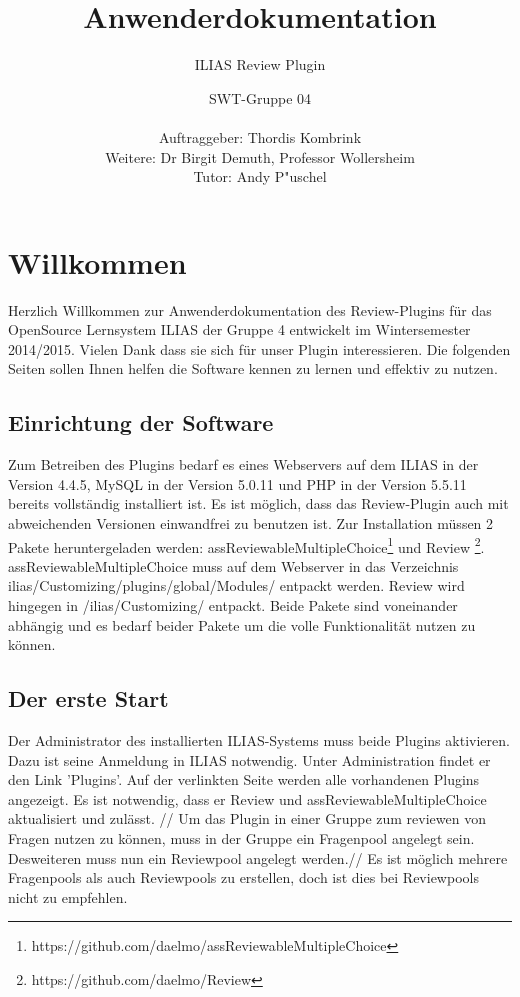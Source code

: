 \documentclass[12pt,a4paper]{scrreprt}
\begin{document}
\title{Anwenderdokumentation}
\subtitle{ILIAS Review Plugin}
\publishers{Version: 5.0, Status: Fertiggestellt}
\author{SWT-Gruppe 04\\ \\Auftraggeber: Thordis Kombrink\\Weitere: Dr Birgit Demuth, Professor Wollersheim\\Tutor: Andy P"uschel}
\maketitle
\tableofcontents

\chapter{Willkommen}
Herzlich Willkommen zur Anwenderdokumentation des Review-Plugins für das OpenSource Lernsystem ILIAS der Gruppe 4 entwickelt im Wintersemester 2014/2015. Vielen Dank dass sie sich für unser Plugin interessieren. Die folgenden Seiten sollen Ihnen helfen die Software kennen zu lernen und effektiv zu nutzen. 
	\section{Einrichtung der Software}
	Zum Betreiben des Plugins bedarf es eines Webservers auf dem ILIAS in der Version 4.4.5, MySQL in der Version 5.0.11 und PHP in der Version 5.5.11 bereits vollständig installiert ist. Es ist möglich, dass das Review-Plugin auch mit abweichenden Versionen einwandfrei zu benutzen ist.
Zur Installation müssen 2 Pakete heruntergeladen werden: assReviewableMultipleChoice\footnote{\label{foot:1}https://github.com/daelmo/assReviewableMultipleChoice}	und Review
\footnote{\label{foot:2}https://github.com/daelmo/Review}. 
	assReviewableMultipleChoice muss auf dem Webserver in das Verzeichnis ilias/Customizing/plugins/global/Modules/ entpackt werden. Review wird hingegen in /ilias/Customizing/ entpackt.
	Beide Pakete sind voneinander abhängig und es bedarf beider Pakete um die volle Funktionalität nutzen zu können.
	\section{Der erste Start}
	Der Administrator des installierten ILIAS-Systems muss beide Plugins aktivieren. Dazu ist seine Anmeldung in ILIAS notwendig. Unter Administration findet er den Link 'Plugins'. Auf der verlinkten Seite werden alle vorhandenen Plugins angezeigt. Es ist notwendig, dass er Review und assReviewableMultipleChoice aktualisiert und zulässt. //
	Um das Plugin in einer Gruppe zum reviewen von Fragen nutzen zu können, muss in der Gruppe ein Fragenpool angelegt sein. Desweiteren muss nun ein Reviewpool angelegt werden.//
	Es ist möglich mehrere Fragenpools als auch Reviewpools zu erstellen, doch ist dies bei Reviewpools nicht zu empfehlen. 
\end{document}
